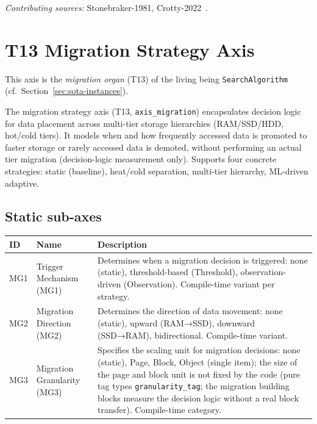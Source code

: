 \emph{Contributing sources:} Stonebraker-1981, Crotty-2022~\cite{stonebraker1981os,crotty2022mmap}.

\section{T13 Migration Strategy Axis}

This axis is the \emph{migration organ} (T13) of the living being \texttt{SearchAlgorithm} (cf.\ Section~\ref{sec:sota-instances}).

The migration strategy axis (T13, \texttt{axis\_\allowbreak{}migration}) encapsulates decision logic for data placement across multi-tier storage hierarchies (RAM/\allowbreak{}SSD/\allowbreak{}HDD, hot/\allowbreak{}cold tiers). It models when and how frequently accessed data is promoted to faster storage or rarely accessed data is demoted, without performing an actual tier migration (decision-logic measurement only). Supports four concrete strategies: static (baseline), heat/\allowbreak{}cold separation, multi-tier hierarchy, ML-driven adaptive.

\subsection*{Static sub-axes}

\begin{scriptsize}
\begin{longtable}{@{}>{\raggedright\arraybackslash}p{1.8cm} >{\raggedright\arraybackslash}p{3.2cm} >{\raggedright\arraybackslash}p{8.5cm}@{}}
\toprule
ID & Name & Description \\
\midrule
\endhead%
MG1 & Trigger Mechanism (MG1) & Determines when a migration decision is triggered: none (static), threshold-based (Threshold), observation-driven (Observation). Compile-time variant per strategy. \\
MG2 & Migration Direction (MG2) & Determines the direction of data movement: none (static), upward (RAM→SSD), downward (SSD→RAM), bidirectional. Compile-time variant. \\
MG3 & Migration Granularity (MG3) & Specifies the scaling unit for migration decisions: none (static), Page, Block, Object (single item); the size of the page and block unit is not fixed by the code (pure tag types \texttt{granularity\_\allowbreak{}tag}; the migration building blocks measure the decision logic without a real block transfer). Compile-time category. \\
\bottomrule
\end{longtable}
\end{scriptsize}

